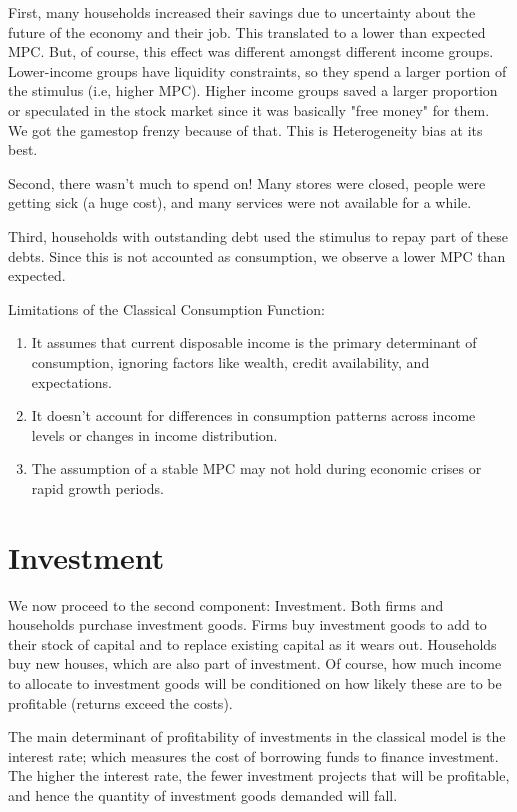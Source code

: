 \documentclass[10pt]{article}
\begin{document}
First, many households increased their savings due to uncertainty about the future of the economy and their job. This translated to a lower than expected MPC. But, of course, this effect was different amongst different income groups. Lower-income groups have liquidity constraints, so they spend a larger portion of the stimulus (i.e, higher MPC). Higher income groups saved a larger proportion or speculated in the stock market since it was basically "free money" for them. We got the gamestop frenzy because of that. This is Heterogeneity bias at its best.

Second, there wasn't much to spend on! Many stores were closed, people were getting sick (a huge cost), and many services were not available for a while.

Third, households with outstanding debt used the stimulus to repay part of these debts. Since this is not accounted as consumption, we observe a lower MPC than expected.

Limitations of the Classical Consumption Function:

\begin{enumerate}
  \item It assumes that current disposable income is the primary determinant of consumption, ignoring factors like wealth, credit availability, and expectations.
  \item It doesn't account for differences in consumption patterns across income levels or changes in income distribution.
  \item The assumption of a stable MPC may not hold during economic crises or rapid growth periods.
\end{enumerate}

\section*{Investment}
We now proceed to the second component: Investment. Both firms and households purchase investment goods. Firms buy investment goods to add to their stock of capital and to replace existing capital as it wears out. Households buy new houses, which are also part of investment. Of course, how much income to allocate to investment goods will be conditioned on how likely these are to be profitable (returns exceed the costs).

The main determinant of profitability of investments in the classical model is the interest rate; which measures the cost of borrowing funds to finance investment. The higher the interest rate, the fewer investment projects that will be profitable, and hence the quantity of investment goods demanded will fall.
\end{document}
